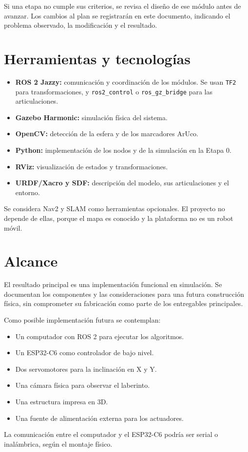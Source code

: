\documentclass[11pt,a4paper]{article}
\begin{document}
Si una etapa no cumple sus criterios, se revisa el diseño de ese módulo antes de avanzar. Los cambios al plan se registrarán en este documento, indicando el problema observado, la modificación y el resultado.

\section{Herramientas y tecnologías}
\begin{itemize}
    \item \textbf{ROS 2 Jazzy:} comunicación y coordinación de los módulos. Se usan \texttt{TF2} para transformaciones, y \texttt{ros2\_control} o \texttt{ros\_gz\_bridge} para las articulaciones.
    \item \textbf{Gazebo Harmonic:} simulación física del sistema.
    \item \textbf{OpenCV:} detección de la esfera y de los marcadores ArUco.
    \item \textbf{Python:} implementación de los nodos y de la simulación en la Etapa 0.
    \item \textbf{RViz:} visualización de estados y transformaciones.
    \item \textbf{URDF/Xacro y SDF:} descripción del modelo, sus articulaciones y el entorno.
\end{itemize}

Se considera Nav2 y SLAM como herramientas opcionales. El proyecto no depende de ellas, porque el mapa es conocido y la plataforma no es un robot móvil.

\section{Alcance}
El resultado principal es una implementación funcional en simulación. Se documentan los componentes y las consideraciones para una futura construcción física, sin comprometer su fabricación como parte de los entregables principales.

Como posible implementación futura se contemplan:
\begin{itemize}
    \item Un computador con ROS 2 para ejecutar los algoritmos.
    \item Un ESP32-C6 como controlador de bajo nivel.
    \item Dos servomotores para la inclinación en X y Y.
    \item Una cámara física para observar el laberinto.
    \item Una estructura impresa en 3D.
    \item Una fuente de alimentación externa para los actuadores.
\end{itemize}
La comunicación entre el computador y el ESP32-C6 podría ser serial o inalámbrica, según el montaje físico.
\end{document}
